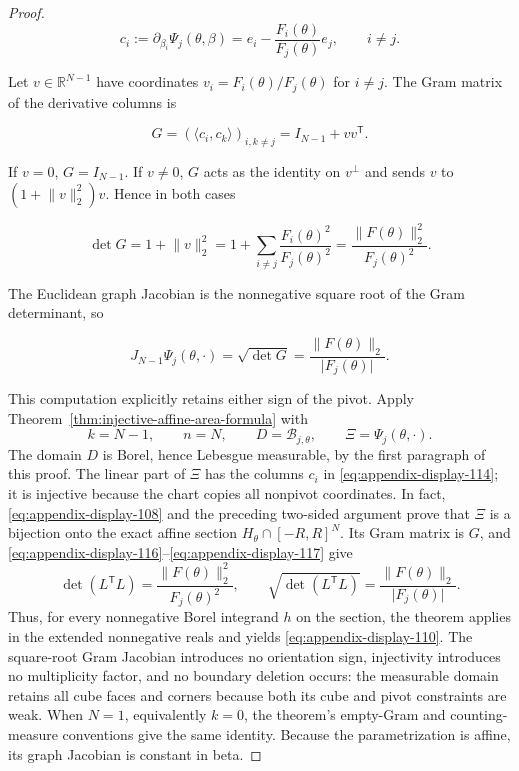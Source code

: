 \begin{proof}
\begin{equation}
\label{eq:appendix-display-114}
c_i
:=\partial_{\beta_i}\Psi_j(\theta,\beta)
=e_i-\frac{F_i(\theta)}{F_j(\theta)}e_j,
\qquad i\neq j.
\end{equation}

Let \(v\in\mathbb R^{N-1}\) have coordinates \(v_i=F_i(\theta)/F_j(\theta)\) for \(i\neq j\). The Gram
matrix of the derivative columns is

\begin{equation}
\label{eq:appendix-display-115}
G=(\langle c_i,c_k\rangle)_{i,k\neq j}
=I_{N-1}+vv^{\mathsf T}.
\end{equation}

If \(v=0\), \(G=I_{N-1}\). If \(v\neq0\), \(G\) acts as the identity on \(v^\perp\) and sends \(v\) to
\((1+\lVert v\rVert_2^2)v\). Hence in both cases

\begin{equation}
\label{eq:appendix-display-116}
\det G
=1+\lVert v\rVert_2^2
=1+\sum_{i\neq j}\frac{F_i(\theta)^2}{F_j(\theta)^2}
=\frac{\lVert F(\theta)\rVert_2^2}{F_j(\theta)^2}.
\end{equation}

The Euclidean graph Jacobian is the nonnegative square root of the Gram determinant, so

\begin{equation}
\label{eq:appendix-display-117}
J_{N-1}\Psi_j(\theta,\cdot)
=\sqrt{\det G}
=\frac{\lVert F(\theta)\rVert_2}{\lvert F_j(\theta)\rvert}.
\end{equation}

This computation explicitly retains either sign of the pivot. Apply
Theorem~\ref{thm:injective-affine-area-formula} with
\[
k=N-1,\qquad n=N,\qquad
D=\mathcal B_{j,\theta},\qquad
\Xi=\Psi_j(\theta,\cdot).
\]
The domain \(D\) is Borel, hence Lebesgue measurable, by the first paragraph of this proof. The linear part of
\(\Xi\) has the columns \(c_i\) in \eqref{eq:appendix-display-114}; it is injective because the chart copies
all nonpivot coordinates. In fact, \eqref{eq:appendix-display-108} and the preceding two-sided argument prove
that \(\Xi\) is a bijection onto the exact affine section \(H_\theta\cap[-R,R]^N\). Its Gram matrix is \(G\),
and \eqref{eq:appendix-display-116}--\eqref{eq:appendix-display-117} give
\[
\det(L^{\mathsf T}L)
=\frac{\lVert F(\theta)\rVert_2^2}{F_j(\theta)^2},
\qquad
\sqrt{\det(L^{\mathsf T}L)}
=\frac{\lVert F(\theta)\rVert_2}{\lvert F_j(\theta)\rvert}.
\]
Thus, for every nonnegative Borel integrand \(h\) on the section, the theorem applies in the extended
nonnegative reals and yields \eqref{eq:appendix-display-110}. The square-root Gram Jacobian introduces no
orientation sign, injectivity introduces no multiplicity factor, and no boundary deletion occurs: the
measurable domain retains all cube faces and corners because both its cube and pivot constraints are weak.
When \(N=1\), equivalently \(k=0\),
the theorem's empty-Gram and counting-measure conventions give the same identity. Because the parametrization
is affine, its graph Jacobian is constant in beta.


\end{proof}
